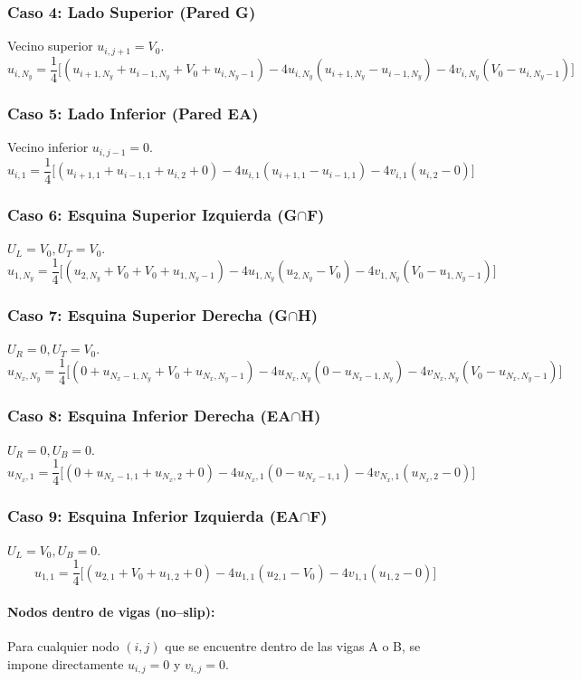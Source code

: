 \documentclass[11pt,letterpaper]{article}
\newcommand{\ux}{u}             %
\newcommand{\vyc}{v}            %
\begin{document}
\subsubsection{Caso 4: Lado Superior (Pared G)}
Vecino superior $\ux_{i,j+1} = V_0$.
\[
\ux_{i,N_y}=\frac{1}{4}\Big[ (\ux_{i+1,N_y}+\ux_{i-1,N_y}+V_0+\ux_{i,N_y-1})
- 4\ux_{i,N_y}(\ux_{i+1,N_y}-\ux_{i-1,N_y})
- 4\vyc_{i,N_y}(V_0-\ux_{i,N_y-1}) \Big]
\]

\subsubsection{Caso 5: Lado Inferior (Pared EA)}
Vecino inferior $\ux_{i,j-1} = 0$.
\[
\ux_{i,1}=\frac{1}{4}\Big[ (\ux_{i+1,1}+\ux_{i-1,1}+\ux_{i,2}+0)
- 4\ux_{i,1}(\ux_{i+1,1}-\ux_{i-1,1})
- 4\vyc_{i,1}(\ux_{i,2}-0) \Big]
\]

\subsubsection{Caso 6: Esquina Superior Izquierda (G$\cap$F)}
$U_L=V_0, U_T=V_0$.
\[
\ux_{1,N_y}=\frac{1}{4}\Big[ (\ux_{2,N_y}+V_0+V_0+\ux_{1,N_y-1})
- 4\ux_{1,N_y}(\ux_{2,N_y}-V_0)
- 4\vyc_{1,N_y}(V_0-\ux_{1,N_y-1}) \Big]
\]

\subsubsection{Caso 7: Esquina Superior Derecha (G$\cap$H)}
$U_R=0, U_T=V_0$.
\[
\ux_{N_x,N_y}=\frac{1}{4}\Big[ (0+\ux_{N_x-1,N_y}+V_0+\ux_{N_x,N_y-1})
- 4\ux_{N_x,N_y}(0-\ux_{N_x-1,N_y})
- 4\vyc_{N_x,N_y}(V_0-\ux_{N_x,N_y-1}) \Big]
\]

\subsubsection{Caso 8: Esquina Inferior Derecha (EA$\cap$H)}
$U_R=0, U_B=0$.
\[
\ux_{N_x,1}=\frac{1}{4}\Big[ (0+\ux_{N_x-1,1}+\ux_{N_x,2}+0)
- 4\ux_{N_x,1}(0-\ux_{N_x-1,1})
- 4\vyc_{N_x,1}(\ux_{N_x,2}-0) \Big]
\]

\subsubsection{Caso 9: Esquina Inferior Izquierda (EA$\cap$F)}
$U_L=V_0, U_B=0$.
\[
\ux_{1,1}=\frac{1}{4}\Big[ (\ux_{2,1}+V_0+\ux_{1,2}+0)
- 4\ux_{1,1}(\ux_{2,1}-V_0)
- 4\vyc_{1,1}(\ux_{1,2}-0) \Big]
\]

\paragraph{Nodos dentro de vigas (no--slip):} Para cualquier nodo $(i,j)$ que se encuentre dentro de las vigas A o B, se impone directamente $\ux_{i,j}=0$ y $\vyc_{i,j}=0$.
\end{document}
